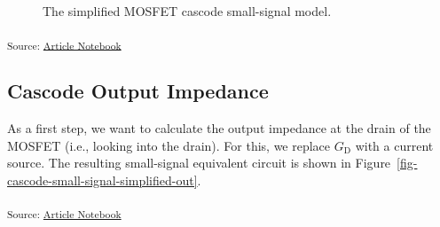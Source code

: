 \documentclass[
  a4paper,
  DIV=11,
  numbers=noendperiod]{scrartcl}
\begin{document}
\begin{figure}[H]


\caption{\label{fig-cascode-small-signal-simplified}The simplified
MOSFET cascode small-signal model.}

\end{figure}%

\textsubscript{Source:
\href{https://iic-jku.github.io/analog-circuit-design/index.qmd.html}{Article
Notebook}}

\subsection{Cascode Output Impedance}\label{cascode-output-impedance}

As a first step, we want to calculate the output impedance at the drain
of the MOSFET (i.e., looking into the drain). For this, we replace
\(G_\mathrm{D}\) with a current source. The resulting small-signal
equivalent circuit is shown in
Figure~\ref{fig-cascode-small-signal-simplified-out}.

\textsubscript{Source:
\href{https://iic-jku.github.io/analog-circuit-design/index.qmd.html}{Article
Notebook}}
\end{document}
